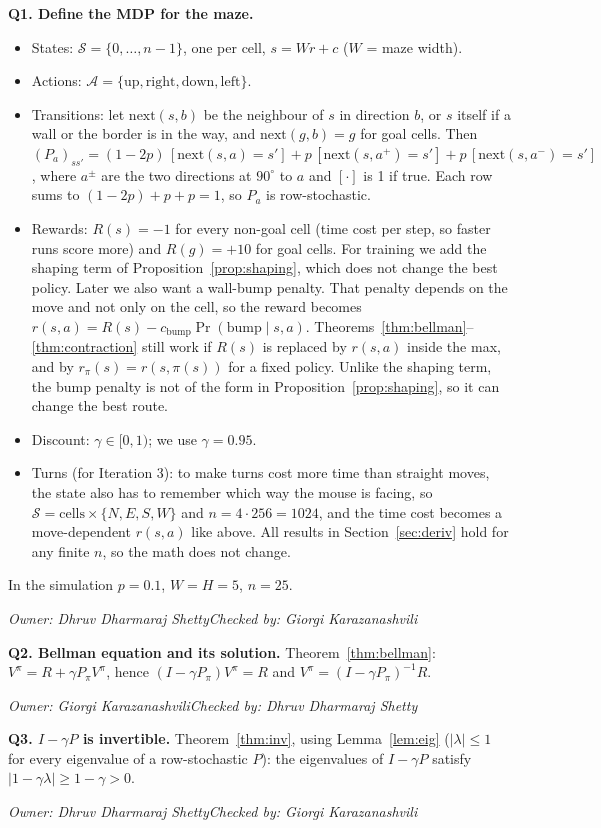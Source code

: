 \documentclass[10pt]{article}
\theoremstyle{definition}
\newcommand{\GK}{Giorgi Karazanashvili}
\newcommand{\DS}{Dhruv Dharmaraj Shetty}
\newcommand{\signoff}[2]{\par\smallskip\hfill\emph{Owner: #1}\qquad\emph{Checked by: #2}\par\medskip}
\newcommand{\Sset}{\mathcal{S}}
\newcommand{\Aset}{\mathcal{A}}
\begin{document}
\noindent\textbf{Q1. Define the MDP for the maze.}
\begin{itemize}[nosep]
\item States: $\Sset = \{0,\dots,n-1\}$, one per cell, $s = Wr+c$ ($W$ = maze width).
\item Actions: $\Aset = \{\text{up},\text{right},\text{down},\text{left}\}$.
\item Transitions: let $\mathrm{next}(s,b)$ be the neighbour of $s$ in direction $b$, or $s$ itself if a wall or the border is in the way, and $\mathrm{next}(g,b) = g$ for goal cells. Then $(P_a)_{ss'} = (1-2p)\,[\mathrm{next}(s,a) = s'] + p\,[\mathrm{next}(s,a^+) = s'] + p\,[\mathrm{next}(s,a^-) = s']$, where $a^\pm$ are the two directions at $90^\circ$ to $a$ and $[\cdot]$ is 1 if true. Each row sums to $(1-2p)+p+p = 1$, so $P_a$ is row-stochastic.
\item Rewards: $R(s) = -1$ for every non-goal cell (time cost per step, so faster runs score more) and $R(g) = +10$ for goal cells. For training we add the shaping term of Proposition~\ref{prop:shaping}, which does not change the best policy. Later we also want a wall-bump penalty. That penalty depends on the move and not only on the cell, so the reward becomes $r(s,a) = R(s) - c_{\mathrm{bump}}\Pr(\text{bump}\mid s,a)$. Theorems~\ref{thm:bellman}--\ref{thm:contraction} still work if $R(s)$ is replaced by $r(s,a)$ inside the max, and by $r_\pi(s) = r(s,\pi(s))$ for a fixed policy. Unlike the shaping term, the bump penalty is not of the form in Proposition~\ref{prop:shaping}, so it can change the best route.
\item Discount: $\gamma\in[0,1)$; we use $\gamma = 0.95$.
\item Turns (for Iteration 3): to make turns cost more time than straight moves, the state also has to remember which way the mouse is facing, so $\Sset = \text{cells}\times\{N,E,S,W\}$ and $n = 4\cdot256 = 1024$, and the time cost becomes a move-dependent $r(s,a)$ like above. All results in Section~\ref{sec:deriv} hold for any finite $n$, so the math does not change.
\end{itemize}
In the simulation $p = 0.1$, $W = H = 5$, $n = 25$.
\signoff{\DS}{\GK}

\noindent\textbf{Q2. Bellman equation and its solution.} Theorem~\ref{thm:bellman}: $V^\pi = R+\gamma P_\pi V^\pi$, hence $(I-\gamma P_\pi)V^\pi = R$ and $V^\pi = (I-\gamma P_\pi)^{-1}R$.
\signoff{\GK}{\DS}

\noindent\textbf{Q3. $I-\gamma P$ is invertible.} Theorem~\ref{thm:inv}, using Lemma~\ref{lem:eig} ($|\lambda|\le1$ for every eigenvalue of a row-stochastic $P$): the eigenvalues of $I-\gamma P$ satisfy $|1-\gamma\lambda|\ge1-\gamma>0$.
\signoff{\DS}{\GK}
\end{document}
